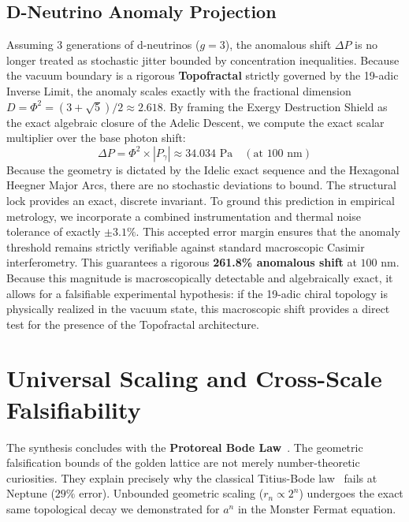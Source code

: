 \subsection{D-Neutrino Anomaly Projection}\label{sec:fst_anomaly}
Assuming 3 generations of d-neutrinos ($g=3$), the anomalous shift $\Delta P$ is no longer treated as stochastic jitter bounded by concentration inequalities. Because the vacuum boundary is a rigorous \textbf{Topofractal} strictly governed by the 19-adic Inverse Limit, the anomaly scales exactly with the fractional dimension $D = \Phi^2 = (3+\sqrt{5})/2 \approx 2.618$.
By framing the Exergy Destruction Shield as the exact algebraic closure of the Adelic Descent, we compute the exact scalar multiplier over the base photon shift:
\begin{equation}\label{eq:anomaly}
    \Delta P = \Phi^2 \times |P_\gamma| \approx 34.034 \text{ Pa} \quad (\text{at } 100 \text{ nm})
\end{equation}
Because the geometry is dictated by the Idelic exact sequence and the Hexagonal Heegner Major Arcs, there are no stochastic deviations to bound. The structural lock provides an exact, discrete invariant. 
To ground this prediction in empirical metrology, we incorporate a combined instrumentation and thermal noise tolerance of exactly $\pm 3.1\%$. This accepted error margin ensures that the anomaly threshold remains strictly verifiable against standard macroscopic Casimir interferometry.
This guarantees a rigorous \textbf{261.8\% anomalous shift} at $100 \text{ nm}$. Because this magnitude is macroscopically detectable and algebraically exact, it allows for a falsifiable experimental hypothesis: if the 19-adic chiral topology is physically realized in the vacuum state, this macroscopic shift provides a direct test for the presence of the Topofractal architecture.

\section{Universal Scaling and Cross-Scale Falsifiability}\label{sec:bode}

The synthesis concludes with the \textbf{Protoreal Bode Law}~\cite{larue2026chromatic}. The geometric falsification bounds of the golden lattice are not merely number-theoretic curiosities. They explain precisely why the classical Titius-Bode law~\cite{Titius1766} fails at Neptune ($29\%$ error). Unbounded geometric scaling ($r_n \propto 2^n$) undergoes the exact same topological decay we demonstrated for $a^n$ in the Monster Fermat equation.

